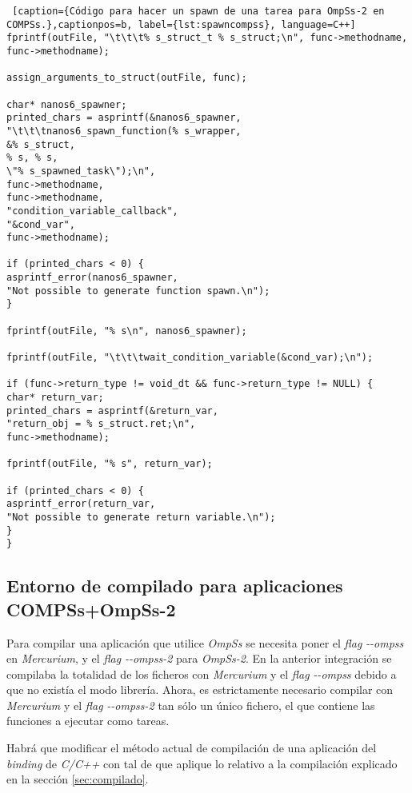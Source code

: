 \begin{minipage}{\linewidth}
\begin{lstlisting} [caption={Código para hacer un spawn de una tarea para OmpSs-2 en COMPSs.},captionpos=b, label={lst:spawncompss}, language=C++]
fprintf(outFile, "\t\t\t% s_struct_t % s_struct;\n", func->methodname, 
func->methodname);

assign_arguments_to_struct(outFile, func);

char* nanos6_spawner;
printed_chars = asprintf(&nanos6_spawner, 
"\t\t\tnanos6_spawn_function(% s_wrapper,
&% s_struct, 
% s, % s, 
\"% s_spawned_task\");\n",
func->methodname, 
func->methodname, 
"condition_variable_callback", 
"&cond_var", 
func->methodname);

if (printed_chars < 0) {
asprintf_error(nanos6_spawner, 
"Not possible to generate function spawn.\n");
}

fprintf(outFile, "% s\n", nanos6_spawner);

fprintf(outFile, "\t\t\twait_condition_variable(&cond_var);\n");

if (func->return_type != void_dt && func->return_type != NULL) {
char* return_var;
printed_chars = asprintf(&return_var, 
"return_obj = % s_struct.ret;\n", 
func->methodname);

fprintf(outFile, "% s", return_var);

if (printed_chars < 0) {
asprintf_error(return_var, 
"Not possible to generate return variable.\n");
}
}
\end{lstlisting}
\end{minipage}

\bigskip
\subsection{Entorno de compilado para aplicaciones COMPSs+OmpSs-2}

Para compilar una aplicación que utilice \textit{OmpSs} se necesita poner el \textit{flag} \textit{-{}-ompss} en \textit{Mercurium}, y el \textit{flag} \textit{-{}-ompss-2} para \textit{OmpSs-2}. En la anterior integración se compilaba la totalidad de los ficheros con \textit{Mercurium} y el \textit{flag} \textit{-{}-ompss} debido a que no existía el modo librería. Ahora, es estrictamente necesario compilar con \textit{Mercurium} y el \textit{flag} \textit{-{}-ompss-2} tan sólo un único fichero, el que contiene las funciones a ejecutar como tareas. 
\par\bigskip
Habrá que modificar el método actual de compilación de una aplicación del \textit{binding} de \textit{C/C++} con tal de que aplique lo relativo a la compilación explicado en la sección \ref{sec:compilado}.
\par\bigskip

